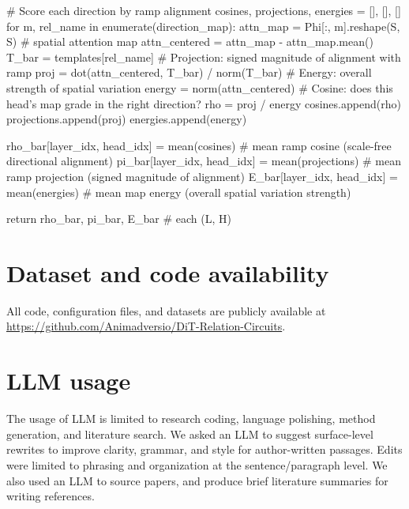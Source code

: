 \documentclass[10pt,twocolumn,letterpaper]{article}
\begin{document}
\begin{RoundedListing}[basicstyle=\fontsize{8}{9}\selectfont\ttfamily\color{atomForeground}]
            # Score each direction by ramp alignment
            cosines, projections, energies = [], [], []
            for m, rel_name in enumerate(direction_map):
                attn_map = Phi[:, m].reshape(S, S)      # spatial attention map
                attn_centered = attn_map - attn_map.mean()
                T_bar = templates[rel_name]
                # Projection: signed magnitude of alignment with ramp
                proj = dot(attn_centered, T_bar) / norm(T_bar)
                # Energy: overall strength of spatial variation
                energy = norm(attn_centered)
                # Cosine: does this head's map grade in the right direction?
                rho = proj / energy
                cosines.append(rho)
                projections.append(proj)
                energies.append(energy)

            rho_bar[layer_idx, head_idx] = mean(cosines) # mean ramp cosine  (scale-free directional alignment)
            pi_bar[layer_idx, head_idx]  = mean(projections) # mean ramp projection (signed magnitude of alignment)
            E_bar[layer_idx, head_idx]   = mean(energies) # mean map energy   (overall spatial variation strength)

    return rho_bar, pi_bar, E_bar  # each (L, H)
\end{RoundedListing}

\clearpage

\section{Dataset and code availability}
\label{sec:code}
All code, configuration files, and datasets are publicly available at \url{https://github.com/Animadversio/DiT-Relation-Circuits}.


\section{LLM usage}
 
The usage of LLM is limited to research coding, language polishing, method generation, and literature search. We asked an LLM to suggest surface-level rewrites to improve clarity, grammar, and style for author-written passages. Edits were limited to phrasing and organization at the sentence/paragraph level. We also used an LLM to source papers, and produce brief literature summaries for writing references.

% 
\end{document}
